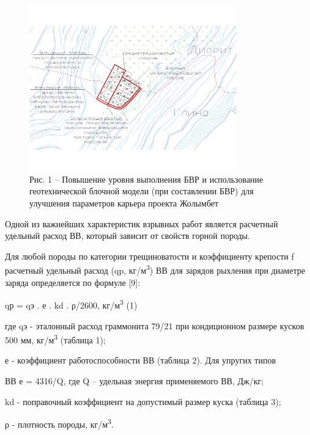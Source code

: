 \begin{figure}[H]
	\centering
	\includegraphics[width=0.8\textwidth]{media/gor/image27}
	\caption*{Рис. 1 -- Повышение уровня выполнения БВР и использование
	геотехнической блочной модели (при составлении БВР) для улучшения
	параметров карьера проекта Жолымбет}
\end{figure}

\begin{multicols}{2}

Одной из важнейших характеристик взрывных работ является расчетный
удельный расход ВВ, который зависит от свойств горной породы.

Для любой породы по категории трещиноватости и коэффициенту крепости f
расчетный удельный расход (qp, кг/м\textsuperscript{3}) ВВ для зарядов
рыхления при диаметре заряда определяется по формуле {[}9{]}:

qр = qэ . е . kd . ρ/2600, кг/м\textsuperscript{3} (1)

где qэ - эталонный расход граммонита 79/21 при кондиционном размере
кусков 500 мм, кг/м\textsuperscript{3} (таблица 1);

е - коэффициент работоспособности ВВ (таблица 2). Для упругих типов

ВВ е = 4316/Q, где Q -- удельная энергия применяемого ВВ, Дж/кг;

kd - поправочный коэффициент на допустимый размер куска (таблица 3);

ρ - плотность породы, кг/м\textsuperscript{3}.

\end{multicols}

